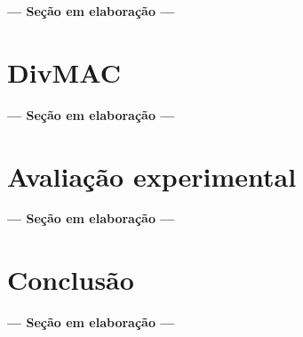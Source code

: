\documentclass[
	12pt,				%
	openright,			%
	oneside,
	a4paper,			%
	english,			%
	french,				%
	spanish,			%
	brazil				%
	]{abntex2}
\begin{document}
\begin{center}
	\textbf{--- Seção em elaboração ---}
\end{center}

\chapter{DivMAC} \label{phymac}

\begin{center}
	\textbf{--- Seção em elaboração ---}
\end{center}

\chapter{Avaliação experimental}

\begin{center}
	\textbf{--- Seção em elaboração ---}
\end{center}


\chapter{Conclusão}

\begin{center}
	\textbf{--- Seção em elaboração ---}
\end{center}

\postextual



%
%

\end{document}
